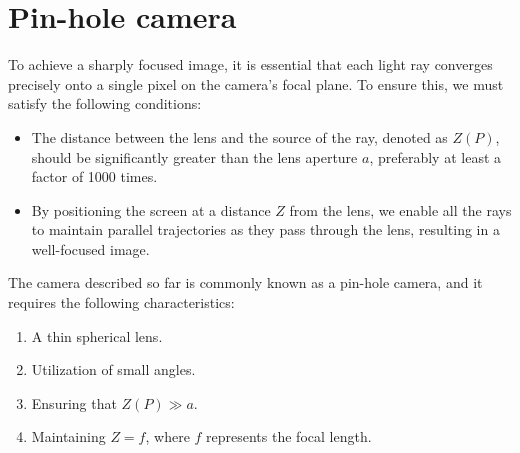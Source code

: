 \section{Pin-hole camera}

To achieve a sharply focused image, it is essential that each light ray converges precisely onto a single pixel on the camera's focal plane. 
To ensure this, we must satisfy the following conditions:
\begin{itemize}
    \item The distance between the lens and the source of the ray, denoted as $Z(P)$, should be significantly greater than the lens aperture $a$, preferably at least a factor of 1000 times.
    \item By positioning the screen at a distance $Z$ from the lens, we enable all the rays to maintain parallel trajectories as they pass through the lens, resulting in a well-focused image.
\end{itemize}
The camera described so far is commonly known as a pin-hole camera, and it requires the following characteristics:
\begin{enumerate}
    \item A thin spherical lens.
    \item Utilization of small angles.
    \item Ensuring that $Z(P) \gg a$.
    \item Maintaining $Z=f$, where $f$ represents the focal length.
\end{enumerate}